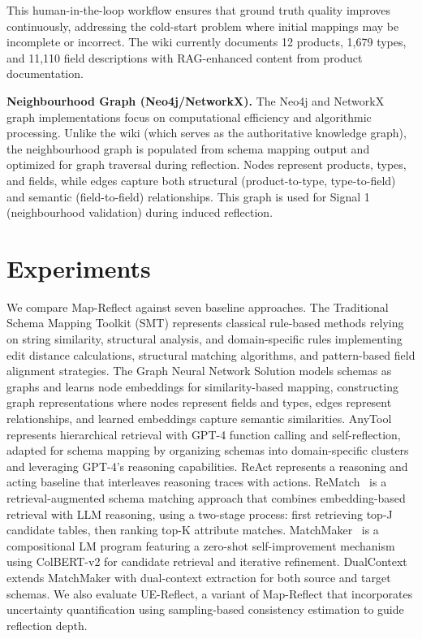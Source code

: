 \documentclass[sigconf, nonacm]{acmart}
\begin{document}
This human-in-the-loop workflow ensures that ground truth quality improves continuously, addressing the cold-start problem where initial mappings may be incomplete or incorrect. The wiki currently documents 12 products, 1,679 types, and 11,110 field descriptions with RAG-enhanced content from product documentation.

\textbf{Neighbourhood Graph (Neo4j/NetworkX).} The Neo4j and NetworkX graph implementations focus on computational efficiency and algorithmic processing. Unlike the wiki (which serves as the authoritative knowledge graph), the neighbourhood graph is populated from schema mapping output and optimized for graph traversal during reflection. Nodes represent products, types, and fields, while edges capture both structural (product-to-type, type-to-field) and semantic (field-to-field) relationships. This graph is used for Signal 1 (neighbourhood validation) during induced reflection.


\section{Experiments}

We compare Map-Reflect against seven baseline approaches. The Traditional Schema Mapping Toolkit (SMT) represents classical rule-based methods relying on string similarity, structural analysis, and domain-specific rules implementing edit distance calculations, structural matching algorithms, and pattern-based field alignment strategies. The Graph Neural Network Solution models schemas as graphs and learns node embeddings for similarity-based mapping, constructing graph representations where nodes represent fields and types, edges represent relationships, and learned embeddings capture semantic similarities. AnyTool represents hierarchical retrieval with GPT-4 function calling and self-reflection, adapted for schema mapping by organizing schemas into domain-specific clusters and leveraging GPT-4's reasoning capabilities. ReAct represents a reasoning and acting baseline that interleaves reasoning traces with actions. ReMatch~\cite{sheetrit2024rematch} is a retrieval-augmented schema matching approach that combines embedding-based retrieval with LLM reasoning, using a two-stage process: first retrieving top-J candidate tables, then ranking top-K attribute matches. MatchMaker~\cite{matchmaker} is a compositional LM program featuring a zero-shot self-improvement mechanism using ColBERT-v2 for candidate retrieval and iterative refinement. DualContext extends MatchMaker with dual-context extraction for both source and target schemas. We also evaluate UE-Reflect, a variant of Map-Reflect that incorporates uncertainty quantification using sampling-based consistency estimation to guide reflection depth.
\end{document}
